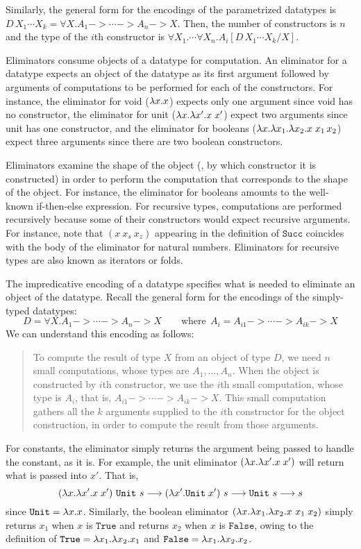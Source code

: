 Similarly, the general form for the encodings of the parametrized datatypes is
$D\,X_1 \cdots X_k = \forall X. A_1 -> \cdots -> A_n -> X$. Then,
the number of constructors is $n$ and the type of the $i$th constructor
is $\forall X_1.\cdots\forall X_n.A_i[D\,X_1 \cdots X_k / X]$.

Eliminators consume objects of a datatype for computation.
An eliminator for a datatype expects an object of the datatype
as its first argument followed by arguments of computations
to be performed for each of the constructors. For instance, the eliminator
for void ($\lambda x.x$) expects only one argument since void has
no constructor, the eliminator for unit ($\lambda x.\lambda x'.x\;x'$) expect
two arguments since unit has one constructor, and the eliminator for booleans
($\lambda x.\lambda x_1. \lambda x_2. x\;x_1\,x_2$) expect three arguments since there are
two boolean constructors.

Eliminators examine the shape of the object (\ie, by which constructor it is
constructed) in order to perform the computation that corresponds to the shape
of the object. For instance, the eliminator for booleans amounts to the
well-known if-then-else expression. For recursive types, computations are
performed recursively because some of their constructors would expect
recursive arguments. For instance, note that $(x~x_s~x_z)$ appearing
in the definition of $\mathtt{Succ}$ coincides with the body of the eliminator
for natural numbers. Eliminators for recursive types are also known as
iterators or folds.

The impredicative encoding of a datatype specifies what is needed to eliminate
an object of the datatype. Recall the general form for the encodings of
the simply-typed datatypes:
\[D = \forall X. A_1 -> \cdots -> A_n -> X
        \qquad\text{where}~~ A_i = A_{i1} -> \cdots -> A_{ik} -> X \]
We can understand this encoding as follows:
\begin{quote}
To compute the result of type $X$ from an object of type $D$,
we need $n$ small computations, whose types are $A_1,\dots,A_n$.
When the object is constructed by $i$th constructor, we use the $i$th small
computation, whose type is $A_i$, that is, $A_{i1} -> \cdots -> A_{ik} -> X$.
This small computation gathers all the $k$ arguments supplied to
the $i$th constructor for the object construction, in order to
compute the result from those arguments.
\end{quote}

For constants, the eliminator simply returns the argument being passed
to handle the constant, as it is. For example, the unit eliminator
$(\lambda x .\lambda x'.x\;x')$ will return what is passed into $x'$. That is,
\[   (\lambda x .\lambda x'.x\;x')~\mathtt{Unit}~s
 --> (\lambda x'.\mathtt{Unit}\;x')~s
 --> \mathtt{Unit}~s
 --> s
\] since $\texttt{Unit}=\lambda x.x$.
Similarly, the boolean eliminator $(\lambda x.\lambda x_1.\lambda x_2.x~x_1\;x_2)$
simply returns $x_1$ when $x$ is $\mathtt{True}$
and returns $x_2$ when $x$ is $\mathtt{False}$,
owing to the definition of $\mathtt{True} = \lambda x_1.\lambda x_2. x_1$
and $\mathtt{False} = \lambda x_1.\lambda x_2. x_2$.

